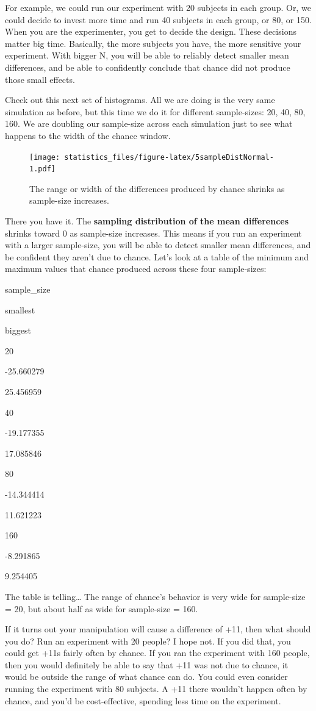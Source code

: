 \documentclass[]{book}
\begin{document}
For example, we could run our experiment with 20 subjects in each group. Or, we could decide to invest more time and run 40 subjects in each group, or 80, or 150. When you are the experimenter, you get to decide the design. These decisions matter big time. Basically, the more subjects you have, the more sensitive your experiment. With bigger N, you will be able to reliably detect smaller mean differences, and be able to confidently conclude that chance did not produce those small effects.

Check out this next set of histograms. All we are doing is the very same simulation as before, but this time we do it for different sample-sizes: 20, 40, 80, 160. We are doubling our sample-size across each simulation just to see what happens to the width of the chance window.

\begin{figure}
\centering
\texttt{[image: statistics\_files/figure-latex/5sampleDistNormal-1.pdf]}
\caption{\label{fig:5sampleDistNormal}The range or width of the differences produced by chance shrinks as sample-size increases.}
\end{figure}

There you have it. The \textbf{sampling distribution of the mean differences} shrinks toward 0 as sample-size increases. This means if you run an experiment with a larger sample-size, you will be able to detect smaller mean differences, and be confident they aren't due to chance. Let's look at a table of the minimum and maximum values that chance produced across these four sample-sizes:

sample\_size

smallest

biggest

20

-25.660279

25.456959

40

-19.177355

17.085846

80

-14.344414

11.621223

160

-8.291865

9.254405

The table is telling\ldots{} The range of chance's behavior is very wide for sample-size = 20, but about half as wide for sample-size = 160.

If it turns out your manipulation will cause a difference of +11, then what should you do? Run an experiment with 20 people? I hope not. If you did that, you could get +11s fairly often by chance. If you ran the experiment with 160 people, then you would definitely be able to say that +11 was not due to chance, it would be outside the range of what chance can do. You could even consider running the experiment with 80 subjects. A +11 there wouldn't happen often by chance, and you'd be cost-effective, spending less time on the experiment.
\end{document}
